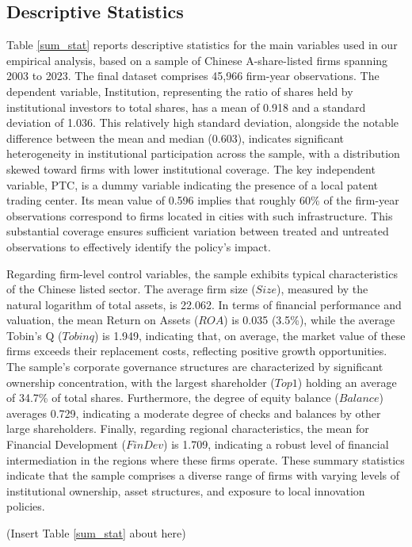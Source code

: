 \documentclass[12pt,a4paper]{article}
\begin{document}
\subsection{Descriptive Statistics}
Table \ref{sum_stat} reports descriptive statistics for the main variables used in our empirical analysis, based on a sample of Chinese A-share-listed firms spanning 2003 to 2023. The final dataset comprises 45,966 firm-year observations. The dependent variable, Institution, representing the ratio of shares held by institutional investors to total shares, has a mean of 0.918 and a standard deviation of 1.036. This relatively high standard deviation, alongside the notable difference between the mean and median (0.603), indicates significant heterogeneity in institutional participation across the sample, with a distribution skewed toward firms with lower institutional coverage. The key independent variable, PTC, is a dummy variable indicating the presence of a local patent trading center. Its mean value of 0.596 implies that roughly 60\% of the firm-year observations correspond to firms located in cities with such infrastructure. This substantial coverage ensures sufficient variation between treated and untreated observations to effectively identify the policy's impact.

Regarding firm-level control variables, the sample exhibits typical characteristics of the Chinese listed sector. The average firm size ($Size$), measured by the natural logarithm of total assets, is 22.062. In terms of financial performance and valuation, the mean Return on Assets ($ROA$) is 0.035 (3.5\%), while the average Tobin’s Q ($Tobinq$) is 1.949, indicating that, on average, the market value of these firms exceeds their replacement costs, reflecting positive growth opportunities. The sample's corporate governance structures are characterized by significant ownership concentration, with the largest shareholder ($Top1$) holding an average of 34.7\% of total shares. Furthermore, the degree of equity balance ($Balance$) averages 0.729, indicating a moderate degree of checks and balances by other large shareholders. Finally, regarding regional characteristics, the mean for Financial Development ($FinDev$) is 1.709, indicating a robust level of financial intermediation in the regions where these firms operate. These summary statistics indicate that the sample comprises a diverse range of firms with varying levels of institutional ownership, asset structures, and exposure to local innovation policies.

\begin{center}
    (Insert Table \ref{sum_stat} about here)
\end{center}
\end{document}
